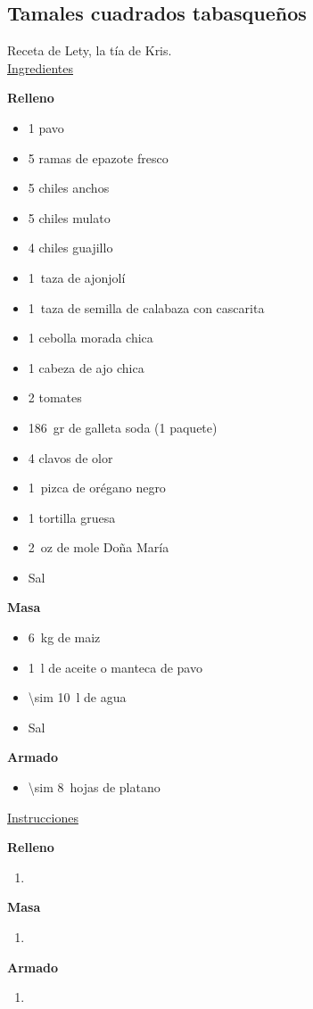 \subsection{Tamales cuadrados tabasqueños}
\label{sec:tamales-cuadrados}

Receta de Lety, la tía de Kris.\\

\underline{Ingredientes}

\textbf{Relleno}
\begin{itemize}
\item 1 pavo
\item 5 ramas de epazote fresco
\item 5 chiles anchos
\item 5 chiles mulato
\item 4 chiles guajillo
\item \SI{1}{taza} de ajonjolí
\item \SI{1}{taza} de semilla de calabaza con cascarita
\item 1 cebolla morada chica
\item 1 cabeza de ajo chica
\item 2 tomates
\item \SI{186}{gr} de galleta soda (1 paquete)
\item 4 clavos de olor
\item \SI{1}{pizca} de orégano negro
\item 1 tortilla gruesa
\item \SI{2}{oz} de mole Doña María
\item Sal
\end{itemize}

\textbf{Masa}
\begin{itemize}
\item \SI{6}{kg} de maiz
\item \SI{1}{l} de aceite o manteca de pavo
\item \SI{\sim 10}{l} de agua
\item Sal
\end{itemize}

\textbf{Armado}
\begin{itemize}
\item \SI{\sim 8}{hojas} de platano
\end{itemize}

\underline{Instrucciones}

\textbf{Relleno}
\begin{enumerate}
\item
\end{enumerate}

\textbf{Masa}
\begin{enumerate}
\item
\end{enumerate}

\textbf{Armado}
\begin{enumerate}
\item
\end{enumerate}